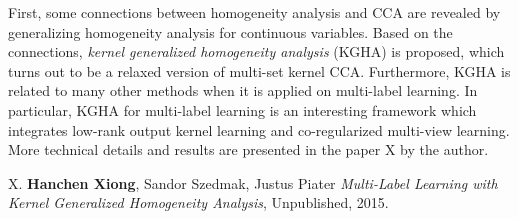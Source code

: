 First, some connections between homogeneity analysis and CCA are revealed by generalizing homogeneity analysis for continuous variables.      
Based on the connections, \emph{kernel generalized homogeneity analysis} (KGHA) is proposed, which turns out to be a relaxed version of 
multi-set kernel CCA.   
Furthermore, KGHA is related to many other methods when it is applied on multi-label learning.          
In particular, KGHA for multi-label learning is an interesting framework which integrates low-rank output kernel learning and 
co-regularized multi-view learning.  More technical details and results are presented in the paper X by the author.
\begin{shaded}
 {\Huge X.} \textbf{Hanchen Xiong}, Sandor Szedmak, Justus Piater {\it Multi-Label Learning with Kernel Generalized Homogeneity Analysis}, 
Unpublished, 2015.
\end{shaded}



